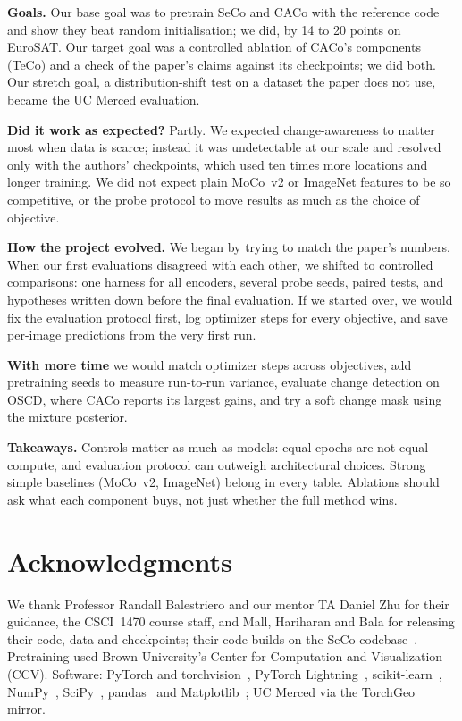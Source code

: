 \documentclass[conference]{IEEEtran}
\begin{document}
\textbf{Goals.} Our base goal was to pretrain SeCo and CACo with the reference code
and show they beat random initialisation; we did, by 14 to 20 points on
EuroSAT. Our target goal was a controlled ablation of CACo's components (TeCo)
and a check of the paper's claims against its checkpoints; we did both. Our
stretch goal, a distribution-shift test on a dataset the paper does not use,
became the UC Merced evaluation.

\textbf{Did it work as expected?} Partly. We expected change-awareness to matter
most when data is scarce; instead it was undetectable at our scale and resolved
only with the authors' checkpoints, which used ten times more locations and
longer training. We did not expect plain MoCo~v2 or ImageNet features to be so
competitive, or the probe protocol to move results as much as the choice of
objective.

\textbf{How the project evolved.} We began by trying to match the paper's
numbers. When our first evaluations disagreed with each other, we shifted to
controlled comparisons: one harness for all encoders, several probe seeds,
paired tests, and hypotheses written down before the final evaluation. If we
started over, we would fix the evaluation protocol first, log optimizer steps for
every objective, and save per-image predictions from the very first run.

\textbf{With more time} we would match optimizer steps across objectives, add
pretraining seeds to measure run-to-run variance, evaluate change detection on
OSCD, where CACo reports its largest gains, and try a soft change mask using
the mixture posterior.

\textbf{Takeaways.} Controls matter as much as models: equal epochs are not equal
compute, and evaluation protocol can outweigh architectural choices. Strong
simple baselines (MoCo~v2, ImageNet) belong in every table. Ablations should
ask what each component buys, not just whether the full method wins.

\section*{Acknowledgments}
We thank Professor Randall Balestriero and our mentor TA Daniel Zhu for their
guidance, the CSCI~1470 course staff, and Mall, Hariharan and Bala for releasing
their code, data and checkpoints; their code builds on the SeCo
codebase~\cite{secocode}. Pretraining used Brown University's Center for
Computation and Visualization (CCV). Software: PyTorch and
torchvision~\cite{paszke2019pytorch}, PyTorch Lightning~\cite{falcon2019lightning},
scikit-learn~\cite{pedregosa2011sklearn}, NumPy~\cite{harris2020numpy},
SciPy~\cite{virtanen2020scipy}, pandas~\cite{mckinney2010pandas} and
Matplotlib~\cite{hunter2007matplotlib}; UC Merced via the
TorchGeo~\cite{stewart2022torchgeo} mirror.



\end{document}

